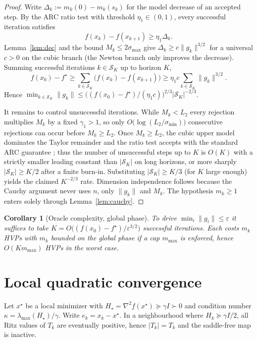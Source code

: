 \documentclass[11pt,a4paper]{article}
\newtheorem{corollary}[theorem]{Corollary}
\theoremstyle{definition}
\begin{document}
\begin{proof}
Write $\Delta_k:=m_k(0)-m_k(s_k)$ for the model decrease of an accepted
step. By the ARC ratio test with threshold $\eta_1\in(0,1)$, every
successful iteration satisfies
\[
f(x_k)-f(x_{k+1})\ge \eta_1\Delta_k.
\]
Lemma~\ref{lem:dec} and the bound $M_k\le 2\sigma_{\max}$ give
$\Delta_k\ge c\|g_k\|^{3/2}$ for a universal $c>0$ on the cubic branch
(the Newton branch only improves the decrease). Summing successful
iterations $k\in\mathcal{S}_K$ up to horizon $K$,
\[
f(x_0)-f^\star
\ge
\sum_{k\in\mathcal{S}_K}\bigl(f(x_k)-f(x_{k+1})\bigr)
\ge
\eta_1 c\sum_{k\in\mathcal{S}_K}\|g_k\|^{3/2}.
\]
Hence
$\min_{k\in\mathcal{S}_K}\|g_k\|
\le
\bigl((f(x_0)-f^\star)/(\eta_1 c)\bigr)^{2/3}
|\mathcal{S}_K|^{-2/3}$.

It remains to control unsuccessful iterations. While $M_k<L_2$ every
rejection multiplies $M_k$ by a fixed $\gamma_1>1$, so only
$O\bigl(\log(L_2/\sigma_{\min})\bigr)$ consecutive rejections can occur
before $M_k\ge L_2$. Once $M_k\ge L_2$, the cubic upper model dominates the
Taylor remainder and the ratio test accepts with the standard ARC
guarantee \cite{cartis2011}; thus the number of unsuccessful steps up to
$K$ is $O(K)$ with a strictly smaller leading constant than
$|\mathcal{S}_K|$ on long horizons, or more sharply
$|\mathcal{S}_K|\ge K/2$ after a finite burn-in. Substituting
$|\mathcal{S}_K|\ge K/3$ (for $K$ large enough) yields the claimed
$K^{-2/3}$ rate. Dimension independence follows because the Cauchy
argument never uses $n$, only $\|g_k\|$ and $M_k$. The hypothesis
$m_k\ge 1$ enters solely through Lemma~\ref{lem:cauchy}.
\end{proof}

\begin{corollary}[Oracle complexity, global phase]
To drive $\min_i\|g_i\|\le\varepsilon$ it suffices to take
$K=O\bigl((f(x_0)-f^\star)/\varepsilon^{3/2}\bigr)$ successful iterations.
Each costs $m_k$ HVPs with $m_k$ bounded on the global phase if a cap
$m_{\max}$ is enforced, hence $O(K m_{\max})$ HVPs in the worst case.
\end{corollary}

\section{Local quadratic convergence}
Let $x^\star$ be a local minimizer with
$H_\star=\nabla^2 f(x^\star)\succeq\gamma I\succ 0$ and condition number
$\kappa=\lambda_{\max}(H_\star)/\gamma$. Write $e_k=x_k-x^\star$.
In a neighbourhood where $H_k\succeq\gamma I/2$, all Ritz values of $T_k$
are eventually positive, hence $|T_k|=T_k$ and the saddle-free map is
inactive.
\end{document}
